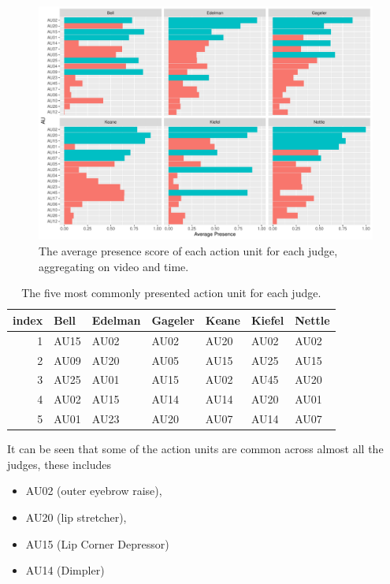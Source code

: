 \documentclass{monashthesis}
\begin{document}
\begin{figure}

{\centering \includegraphics[width=1\linewidth]{figures/unnamed-chunk-4-1} 

}

\caption{The average presence score of each action unit for each judge, aggregating on video and time. \label{fig:mean_presence}}\label{fig:unnamed-chunk-4}
\end{figure}

\begin{table}

\caption{\label{tab:unnamed-chunk-5}\label{tab:most_common}The five most commonly presented action unit for each judge.}
\centering
\begin{tabular}[t]{r|l|l|l|l|l|l}
\hline
index & Bell & Edelman & Gageler & Keane & Kiefel & Nettle\\
\hline
1 & AU15 & AU02 & AU02 & AU20 & AU02 & AU02\\
\hline
2 & AU09 & AU20 & AU05 & AU15 & AU25 & AU15\\
\hline
3 & AU25 & AU01 & AU15 & AU02 & AU45 & AU20\\
\hline
4 & AU02 & AU15 & AU14 & AU14 & AU20 & AU01\\
\hline
5 & AU01 & AU23 & AU20 & AU07 & AU14 & AU07\\
\hline
\end{tabular}
\end{table}

It can be seen that some of the action units are common across almost all the judges, these includes

\begin{itemize}
\tightlist
\item
  AU02 (outer eyebrow raise),
\item
  AU20 (lip stretcher),
\item
  AU15 (Lip Corner Depressor)
\item
  AU14 (Dimpler)
\end{itemize}
\end{document}
